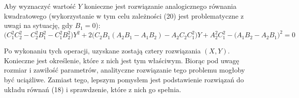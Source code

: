 \documentclass[10pt]{article}
\begin{document}
\newpage
Aby wyznaczyć wartość $Y$ konieczne jest rozwiązanie analogicznego równania kwadratowego (wykorzystanie w tym celu zależności (20) jest problematyczne z uwagi na sytuację, gdy $B_1 = 0$):
\begin{equation}
\big(C_1^2 C_2^2 - C_2^2 B_1^2 - C_1^2 B_2^2 \big) Y^2 + 
2\big(C_2B_1 (A_2B_1 - A_1B_2) - A_2C_2C_1^2 \big) Y +
A_2^2 C_1^2 - \big(A_1B_2 - A_2B_1 \big)^2
 = 0
\end{equation}

Po wykonaniu tych operacji, uzyskane zostają cztery rozwiązania $(X,Y)$. Konieczne jest określenie, które z nich jest tym właściwym. Biorąc pod uwagę rozmiar i zawiłość parametrów, analityczne rozwiązanie tego problemu mogłoby być uciążliwe. Zamiast tego, lepszym pomysłem jest podstawienie rozwiązań do układu równań (18) i sprawdzenie, które z nich go spełnia.
\end{document}
